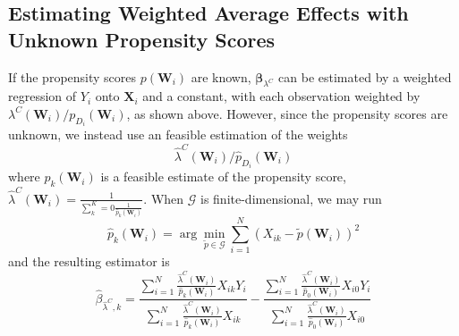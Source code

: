 \documentclass[twoside]{article}
\begin{document}
\subsection{Estimating Weighted Average Effects with Unknown Propensity Scores}
If the propensity scores $p(\mathbf{W}_i)$ are known, $\boldsymbol{\beta}_{\lambda^C}$ can be estimated by a weighted regression of $Y_i$ onto $\mathbf{X}_i$ and a constant, with each observation weighted by $\lambda^C(\mathbf{W}_i)/p_{D_i}(\mathbf{W}_i)$, as shown above. However, since the propensity scores are unknown, we instead use an feasible estimation of the weights
$$
\hat{\lambda}^C(\mathbf{W}_i)/\hat{p}_{D_i}(\mathbf{W}_i)
$$
where $\hat{p}_k(\mathbf{W}_i)$ is a feasible estimate of the propensity score, $\hat{\lambda}^C(\mathbf{W}_i)=\frac{1}{\sum^K_k=0\frac{1}{\hat{p}_k(\mathbf{W}_i)}}$. When $\mathcal{G}$ is finite-dimensional, we may run
$$
\hat{p}_k(\mathbf{W}_i) = \arg\min_{\tilde{p}\in\mathcal{G}} \sum^N_{i=1}\left( X_{ik} - \tilde{p}(\mathbf{W}_i)\right)^2
$$
and the resulting estimator is
\begin{equation}
    \hat{\beta}_{\hat{\lambda}^C,k} = \frac{ \sum^N_{i=1} \frac{\hat{\lambda}^C(\mathbf{W}_i)}{\hat{p}_k(\mathbf{W}_i)} X_{ik}Y_i }{\sum^N_{i=1}\frac{\hat{\lambda}^C(\mathbf{W}_i)}{\hat{p}_k(\mathbf{W}_i)}X_{ik}} - \frac{\sum^N_{i=1} \frac{\hat{\lambda}^C(\mathbf{W}_i)}{\hat{p}_0(\mathbf{W}_i)} X_{i0}Y_i}{\sum^N_{i=1} \frac{\hat{\lambda}^C(\mathbf{W}_i)}{\hat{p}_0(\mathbf{W}_i)} X_{i0}}
\end{equation}
\end{document}
